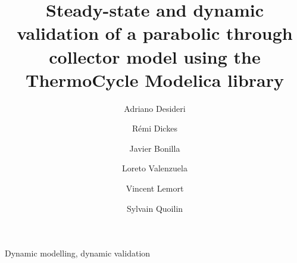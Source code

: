 \documentclass[final,3p,times,review]{elsarticle}
\begin{document}
\linenumbers
\modulolinenumbers[1]
\begin{frontmatter}



\title{Steady-state and dynamic validation of a parabolic through collector model using the ThermoCycle Modelica library}


\author[rvt]{Adriano Desideri}
\author[rvt]{R\'emi Dickes}
\author[focal]{Javier Bonilla}
\author[focal]{Loreto Valenzuela}
\author[rvt]{Vincent Lemort}
\author[rvt]{Sylvain Quoilin}

\address[rvt]{Thermodynamics Laboratory, Aerospace and Mechanical Engineering Department, University of Li\`ege, B-4000, Li\`ege, Belgium}
\address[focal]{PSA-CIEMAT, Plataforma Solar de Almer\' ia - Centro de Investigaciones Energ\' eticas, MedioAmbientales y Tecnológicas, Crta. de Sen\' es s/n, 04200, Tabernas (Almer\' ia), Spain}
%
%
%
%
%
%
%
%
%
\address{}
%
\begin{abstract}

\end{abstract}
%
\begin{keyword}
Dynamic modelling, dynamic validation


\end{keyword}

\end{frontmatter}
\end{document}
